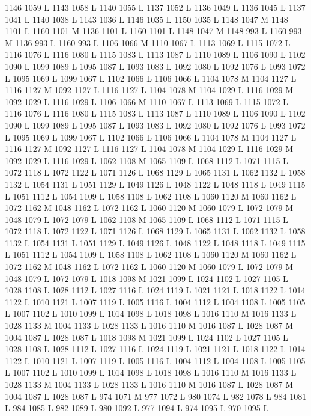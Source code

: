 {{{{{{{{{{{{{{{{{{1146 1059 L
1143 1058 L
1140 1055 L
1137 1052 L
1136 1049 L
1136 1045 L
1137 1041 L
1140 1038 L
1143 1036 L
1146 1035 L
1150 1035 L
1148 1047 M 1148 1101 L
1160 1101 M 1136 1101 L
1160 1101 L
1148 1047 M 1148 993 L
1160 993 M 1136 993 L
1160 993 L
1106 1066 M 1110 1067 L
1113 1069 L
1115 1072 L
1116 1076 L
1116 1080 L
1115 1083 L
1113 1087 L
1110 1089 L
1106 1090 L
1102 1090 L
1099 1089 L
1095 1087 L
1093 1083 L
1092 1080 L
1092 1076 L
1093 1072 L
1095 1069 L
1099 1067 L
1102 1066 L
1106 1066 L
1104 1078 M 1104 1127 L
1116 1127 M 1092 1127 L
1116 1127 L
1104 1078 M 1104 1029 L
1116 1029 M 1092 1029 L
1116 1029 L
1106 1066 M 1110 1067 L
1113 1069 L
1115 1072 L
1116 1076 L
1116 1080 L
1115 1083 L
1113 1087 L
1110 1089 L
1106 1090 L
1102 1090 L
1099 1089 L
1095 1087 L
1093 1083 L
1092 1080 L
1092 1076 L
1093 1072 L
1095 1069 L
1099 1067 L
1102 1066 L
1106 1066 L
1104 1078 M 1104 1127 L
1116 1127 M 1092 1127 L
1116 1127 L
1104 1078 M 1104 1029 L
1116 1029 M 1092 1029 L
1116 1029 L
1062 1108 M 1065 1109 L
1068 1112 L
1071 1115 L
1072 1118 L
1072 1122 L
1071 1126 L
1068 1129 L
1065 1131 L
1062 1132 L
1058 1132 L
1054 1131 L
1051 1129 L
1049 1126 L
1048 1122 L
1048 1118 L
1049 1115 L
1051 1112 L
1054 1109 L
1058 1108 L
1062 1108 L
1060 1120 M 1060 1162 L
1072 1162 M 1048 1162 L
1072 1162 L
1060 1120 M 1060 1079 L
1072 1079 M 1048 1079 L
1072 1079 L
1062 1108 M 1065 1109 L
1068 1112 L
1071 1115 L
1072 1118 L
1072 1122 L
1071 1126 L
1068 1129 L
1065 1131 L
1062 1132 L
1058 1132 L
1054 1131 L
1051 1129 L
1049 1126 L
1048 1122 L
1048 1118 L
1049 1115 L
1051 1112 L
1054 1109 L
1058 1108 L
1062 1108 L
1060 1120 M 1060 1162 L
1072 1162 M 1048 1162 L
1072 1162 L
1060 1120 M 1060 1079 L
1072 1079 M 1048 1079 L
1072 1079 L
1018 1098 M 1021 1099 L
1024 1102 L
1027 1105 L
1028 1108 L
1028 1112 L
1027 1116 L
1024 1119 L
1021 1121 L
1018 1122 L
1014 1122 L
1010 1121 L
1007 1119 L
1005 1116 L
1004 1112 L
1004 1108 L
1005 1105 L
1007 1102 L
1010 1099 L
1014 1098 L
1018 1098 L
1016 1110 M 1016 1133 L
1028 1133 M 1004 1133 L
1028 1133 L
1016 1110 M 1016 1087 L
1028 1087 M 1004 1087 L
1028 1087 L
1018 1098 M 1021 1099 L
1024 1102 L
1027 1105 L
1028 1108 L
1028 1112 L
1027 1116 L
1024 1119 L
1021 1121 L
1018 1122 L
1014 1122 L
1010 1121 L
1007 1119 L
1005 1116 L
1004 1112 L
1004 1108 L
1005 1105 L
1007 1102 L
1010 1099 L
1014 1098 L
1018 1098 L
1016 1110 M 1016 1133 L
1028 1133 M 1004 1133 L
1028 1133 L
1016 1110 M 1016 1087 L
1028 1087 M 1004 1087 L
1028 1087 L
974 1071 M 977 1072 L
980 1074 L
982 1078 L
984 1081 L
984 1085 L
982 1089 L
980 1092 L
977 1094 L
974 1095 L
970 1095 L
}}}}}}}}}}}}}}}}}}
